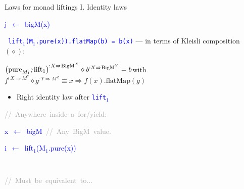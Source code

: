 \documentclass[english]{beamer}
\newenvironment{lyxcode}
  {\par\begin{list}{}{
    \setlength{\rightmargin}{\leftmargin}
    \setlength{\listparindent}{0pt}%
    \raggedright
    \setlength{\itemsep}{0pt}
    \setlength{\parsep}{0pt}
    \normalfont\ttfamily}%
   \def\{{\char`\{}
   \def\}{\char`\}}
   \def\textasciitilde{\char`\~}
   \item[]}
  {\end{list}}
\newcommand{\bef}{\ensuremath\raisebox{2pt}{$\mathsmaller{\mathsmaller{\circ}}$}\hspace{-3.3pt},}
\begin{document}
\begin{frame}{Laws for monad liftings I. Identity laws}
\begin{minipage}[t]{0.54\columnwidth}
\begin{lyxcode}
\textcolor{blue}{\footnotesize{}j~$\leftarrow$~bigM(x)}{\footnotesize\par}
\end{lyxcode}
%
\end{minipage}\texttt{\textcolor{blue}{\footnotesize{}\smallskip{}
lift$_{1}$(M$_{1}$.pure(x)).flatMap(b) = b(x)}} --- in terms of
Kleisli composition $\left(\diamond\right)$:
\begin{center}
{\footnotesize{}\vspace{-0.2cm}\hspace{-0.0cm}$\left(\text{pure}_{M_{1}}\bef\text{lift}_{1}\right)^{:X\Rightarrow\text{BigM}^{X}}\diamond b^{:X\Rightarrow\text{BigM}^{Y}}=b$\hspace*{\fill}with
$f^{:X\Rightarrow M^{Y}}\diamond g^{:Y\Rightarrow M^{Z}}\equiv x\Rightarrow f(x).\text{flatMap}(g)$}{\footnotesize\par}
\par\end{center}
\begin{itemize}
\item {\footnotesize{}\vspace{-0.2cm}\hspace{-0.0cm}}Right identity law
after \texttt{\textcolor{blue}{\footnotesize{}lift$_{1}$}} 
\end{itemize}
{\footnotesize{}\vspace{-0.3cm}\hspace{-0.0cm}}\texttt{\textcolor{blue}{\footnotesize{}}}%
\begin{minipage}[t]{0.54\columnwidth}%
\begin{lyxcode}
\textrm{\textcolor{darkgray}{\footnotesize{}//~Anywhere~inside~a~for/yield:}}{\footnotesize\par}

\textcolor{blue}{\footnotesize{}x~$\leftarrow$~bigM~}\textrm{\textcolor{darkgray}{\footnotesize{}//~Any~BigM~value.}}{\footnotesize\par}

\textcolor{blue}{\footnotesize{}i~$\leftarrow$~lift$_{1}$(M$_{1}$.pure(x))}{\footnotesize\par}
\end{lyxcode}
%
\end{minipage}\texttt{\textcolor{blue}{\footnotesize{}~ }}%
\begin{minipage}[t]{0.54\columnwidth}%
\begin{lyxcode}
\textrm{\textcolor{darkgray}{\footnotesize{}//~Must~be~equivalent~to...}}{\footnotesize\par}


\end{lyxcode}
\end{minipage}
\end{frame}
\end{document}
